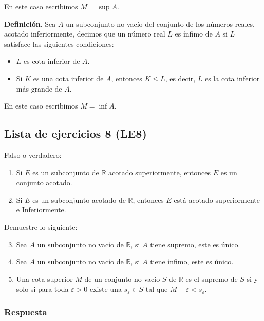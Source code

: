\documentclass[11pt]{article}
\newcommand{\R}{\mathbb{R}}
\begin{document}
En este caso escribimos $M=\sup{A}$.

\textbf{Definición}. Sea $A$ un subconjunto no vacío del conjunto de los números reales, acotado inferiormente, decimos que un número real $L$ es ínfimo de $A$ si $L$ satisface las siguientes condiciones: \begin{itemize}
    \item $L$ es cota inferior de $A$.
    \item Si $K$ es una cota inferior de $A$, entonces $K\leq L$, es decir, $L$ es la cota inferior más grande de $A$.
\end{itemize}

En este caso escribimos $M=\inf{A}$.

\subsection*{Lista de ejercicios 8 (LE8)}

Falso o verdadero: \begin{enumerate}[label=\arabic*.]
    \item Si $E$ es un subconjunto de $\R$ acotado superiormente, entonces $E$ es un conjunto acotado.
    \item Si $E$ es un subconjunto acotado de $\R$, entonces $E$ está acotado superiormente e Inferiormente.
\end{enumerate}

Demuestre lo siguiente:

\begin{enumerate}[label=\arabic*.]\setcounter{enumi}{2}
    \item Sea $A$ un subconjunto no vacío de $\R$, si $A$ tiene supremo, este es único.
    \item Sea $A$ un subconjunto no vacío de $\R$, si $A$ tiene ínfimo, este es único.
    \item Una cota superior $M$ de un conjunto no vacío $S$ de $\R$ es el supremo de $S$ si y solo si para toda $\varepsilon>0$ existe una $s_\varepsilon \in S$ tal que $M-\varepsilon<s_\varepsilon$.
\end{enumerate}

\subsubsection*{Respuesta}
\end{document}
